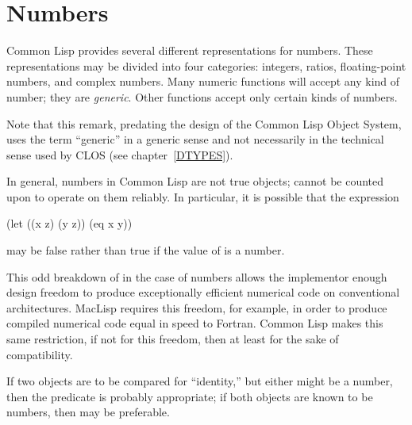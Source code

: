 
\clearpage\def\pagestatus{FINAL PROOF}

\begingroup
\def\arcsinh{\mathop\textrm{arcsinh}\nolimits}
\def\arccosh{\mathop\textrm{arccosh}\nolimits}
\def\arctanh{\mathop\textrm{arctanh}\nolimits}
\def\cis{\mathop\textrm{cis}\nolimits}
\def\phase{\mathop\textrm{phase}\nolimits}

\ifx \rulang\Undef

\chapter{Numbers}
\label{NUMBER}

Common Lisp provides several different representations for numbers.
These representations may be divided into four categories: integers,
ratios, floating-point numbers, and complex numbers.  Many numeric
functions will accept any kind of number; they are \emph{generic}.  Other
functions accept only certain kinds of numbers.

\begin{new}
Note that this remark, predating the design of the Common Lisp Object System,
uses the term ``generic'' in a generic sense and not necessarily
in the technical sense used by CLOS
(see chapter~\ref{DTYPES}).
\end{new}

In general, numbers in Common Lisp are not true objects;  cannot
be counted upon to operate on them reliably.  In particular,
it is possible that the expression
\begin{lisp}
(let ((x z) (y z)) (eq x y))
\end{lisp}
may be false rather than true if the value of  is a number.

\beforenoterule
\begin{rationale}
This odd breakdown of  in the case of numbers
allows the implementor enough design freedom to produce exceptionally
efficient numerical code on conventional architectures.
MacLisp requires this freedom, for example, in order to produce compiled
numerical code equal in speed to Fortran.
Common Lisp makes this same restriction,
if not for this freedom, then at least for the sake of compatibility.
\end{rationale}
\afternoterule

If two objects are to be compared for ``identity,'' but either might be
a number, then the predicate  is probably appropriate;
if both objects are known to be numbers, then \cdf{=}
may be preferable.

